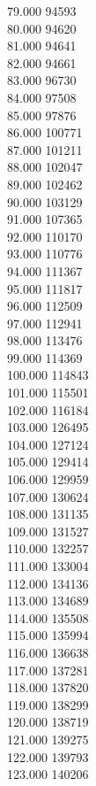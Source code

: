 { 79.000	94593 \\
 80.000	94620 \\
 81.000	94641 \\
 82.000	94661 \\
 83.000	96730 \\
 84.000	97508 \\
 85.000	97876 \\
 86.000	100771 \\
 87.000	101211 \\
 88.000	102047 \\
 89.000	102462 \\
 90.000	103129 \\
 91.000	107365 \\
 92.000	110170 \\
 93.000	110776 \\
 94.000	111367 \\
 95.000	111817 \\
 96.000	112509 \\
 97.000	112941 \\
 98.000	113476 \\
 99.000	114369 \\
 100.000	114843 \\
 101.000	115501 \\
 102.000	116184 \\
 103.000	126495 \\
 104.000	127124 \\
 105.000	129414 \\
 106.000	129959 \\
 107.000	130624 \\
 108.000	131135 \\
 109.000	131527 \\
 110.000	132257 \\
 111.000	133004 \\
 112.000	134136 \\
 113.000	134689 \\
 114.000	135508 \\
 115.000	135994 \\
 116.000	136638 \\
 117.000	137281 \\
 118.000	137820 \\
 119.000	138299 \\
 120.000	138719 \\
 121.000	139275 \\
 122.000	139793 \\
 123.000	140206 \\
}
